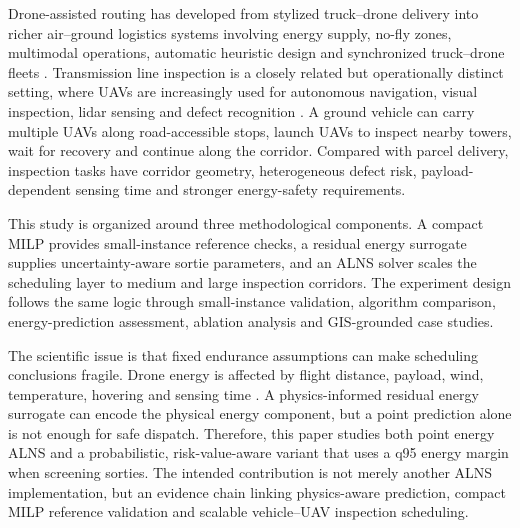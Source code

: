 \documentclass[preprint,12pt,number]{elsarticle}
\newcommand{\rev}[1]{{\color{blue}#1}}
\begin{document}
Drone-assisted routing has developed from stylized truck--drone delivery into richer air--ground logistics systems involving energy supply, no-fly zones, multimodal operations, automatic heuristic design and synchronized truck--drone fleets \cite{murray2015flying,dorling2017vehicle,otto2018survey,kim2026bidirectional,liu2026evtol,zhang2026airground,shi2026llm,yang2025integrated}. Transmission line inspection is a closely related but operationally distinct setting, where UAVs are increasingly used for autonomous navigation, visual inspection, lidar sensing and defect recognition \cite{hui2019monocular,li2021uavtransmission,nguyen2018visionreview,liu2021uavlidar,zhang2020visualinspection}. A ground vehicle can carry multiple UAVs along road-accessible stops, launch UAVs to inspect nearby towers, wait for recovery and continue along the corridor. Compared with parcel delivery, inspection tasks have corridor geometry, heterogeneous defect risk, payload-dependent sensing time and stronger energy-safety requirements.

\rev{This study is organized around three methodological components. A compact MILP provides small-instance reference checks, a residual energy surrogate supplies uncertainty-aware sortie parameters, and an ALNS solver scales the scheduling layer to medium and large inspection corridors. The experiment design follows the same logic through small-instance validation, algorithm comparison, energy-prediction assessment, ablation analysis and GIS-grounded case studies.}

The scientific issue is that fixed endurance assumptions can make scheduling conclusions fragile. Drone energy is affected by flight distance, payload, wind, temperature, hovering and sensing time \cite{stolaroff2018energy,zhang2021energyconsumption,aiello2021energy,chiang2019sustainability,cokyasar2023regional}. A physics-informed residual energy surrogate can encode the physical energy component, but a point prediction alone is not enough for safe dispatch. Therefore, this paper studies both point energy ALNS and a probabilistic, risk-value-aware variant that uses a q95 energy margin when screening sorties. The intended contribution is not merely another ALNS implementation, but an evidence chain linking physics-aware prediction, compact MILP reference validation and scalable vehicle--UAV inspection scheduling.
\end{document}
